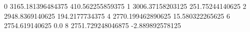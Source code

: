 0 3165.181396484375 410.562255859375
1 3006.37158203125 251.75244140625
2 2948.8369140625 194.2177734375
4 2770.199462890625 15.580322265625
6 2754.619140625 0.0
8 2751.729248046875 -2.889892578125
